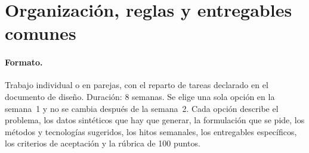 \section{Organización, reglas y entregables comunes}
\label{sec:proy-comun}

\paragraph{Formato.} Trabajo individual o en parejas, con el reparto de tareas declarado en el documento de diseño. Duración: 8 semanas. Se elige una sola opción en la semana~1 y no se cambia después de la semana~2. Cada opción describe el problema, los datos sintéticos que hay que generar, la formulación que se pide, los métodos y tecnologías sugeridos, los hitos semanales, los entregables específicos, los criterios de aceptación y la rúbrica de 100 puntos.

